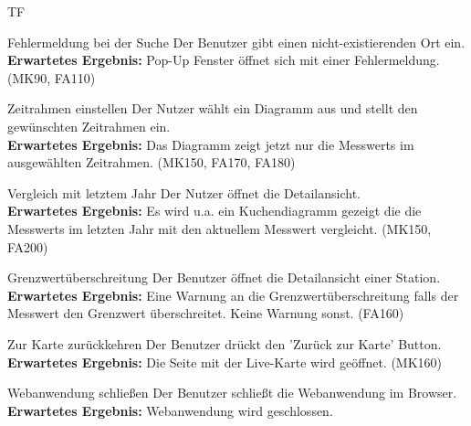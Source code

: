 \begin{Kriterien}{TF}
	\item[Fehlermeldung bei der Suche] Der Benutzer gibt einen nicht-existierenden Ort ein. \\ \textbf{Erwartetes Ergebnis:} Pop-Up Fenster öffnet sich mit einer Fehlermeldung. (MK90, FA110)
    
    \item[Zeitrahmen einstellen] Der Nutzer wählt ein Diagramm aus und stellt den gewünschten Zeitrahmen ein. \\ \textbf{Erwartetes Ergebnis:} Das Diagramm zeigt jetzt nur die \glspl{Messwert} im ausgewählten Zeitrahmen. (MK150, FA170, FA180)
    
    \item[Vergleich mit letztem Jahr] Der Nutzer öffnet die \gls{Detailansicht}. \\ \textbf{Erwartetes Ergebnis:} Es wird u.a. ein Kuchendiagramm gezeigt die die \glspl{Messwert} im letzten Jahr mit den aktuellem Messwert vergleicht. (MK150, FA200)
    
    \item[Grenzwertüberschreitung] Der Benutzer öffnet die \gls{Detailansicht} einer \gls{Station}. \\ \textbf{Erwartetes Ergebnis:} Eine Warnung an die Grenzwertüberschreitung falls der \gls{Messwert} den Grenzwert überschreitet. Keine Warnung sonst. (FA160)
	
	\item[Zur Karte zurückkehren] Der Benutzer drückt den 'Zurück zur Karte' Button. \\ \textbf{Erwartetes Ergebnis:} Die Seite mit der \gls{Live-Karte} wird geöffnet. (MK160)
	
	\item[Webanwendung schließen] Der Benutzer schließt die Webanwendung im Browser. \\ \textbf{Erwartetes Ergebnis:} Webanwendung wird geschlossen.
\end{Kriterien}
